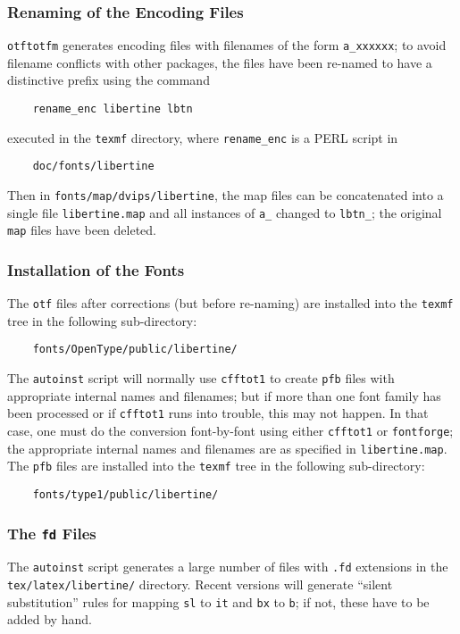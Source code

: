 \documentclass[11pt]{article}
\begin{document}
\subsubsection{Renaming of the Encoding Files}
\texttt{otftotfm} generates encoding files with filenames of the form \verb|a_xxxxxx|;
to avoid filename conflicts with other packages, the files have been re-named
to have a distinctive prefix using the
command
\begin{verbatim}
    rename_enc libertine lbtn
\end{verbatim}
executed in the \texttt{texmf} directory, where
\verb|rename_enc| is a PERL script in
\begin{verbatim}
    doc/fonts/libertine
\end{verbatim}
Then in \verb|fonts/map/dvips/libertine|,
the map files can be concatenated into a single file \verb|libertine.map| and
all instances of \verb|a_| changed to \verb|lbtn_|; the
original \verb|map| files have been deleted.

\subsubsection{Installation of the Fonts}

The \texttt{otf} files after corrections (but before re-naming) are
installed into the \texttt{texmf} tree in the following sub-directory:
\begin{verbatim}
    fonts/OpenType/public/libertine/
\end{verbatim}
The \texttt{autoinst} script will normally use \texttt{cfftot1}
to create \verb|pfb| files with appropriate internal names
and filenames; but if more than one font family has been processed
or if \texttt{cfftot1} runs into trouble, this may not happen.  In that
case, one must do the conversion font-by-font using either \texttt{cfftot1}
or \texttt{fontforge}; the appropriate internal names and filenames are as specified in
\verb|libertine.map|.
The \texttt{pfb} files are installed into the \texttt{texmf} tree in the following
sub-directory:
\begin{verbatim}
    fonts/type1/public/libertine/
\end{verbatim}

\subsubsection{The \texttt{fd} Files}
The \texttt{autoinst} script generates a large number of files with
\verb|.fd| extensions in the \verb|tex/latex/libertine/| directory.
Recent versions will generate ``silent substitution''
rules for mapping \texttt{sl} to \texttt{it} and \texttt{bx} to \texttt{b};
if not, these have to be added by hand.
\end{document}
